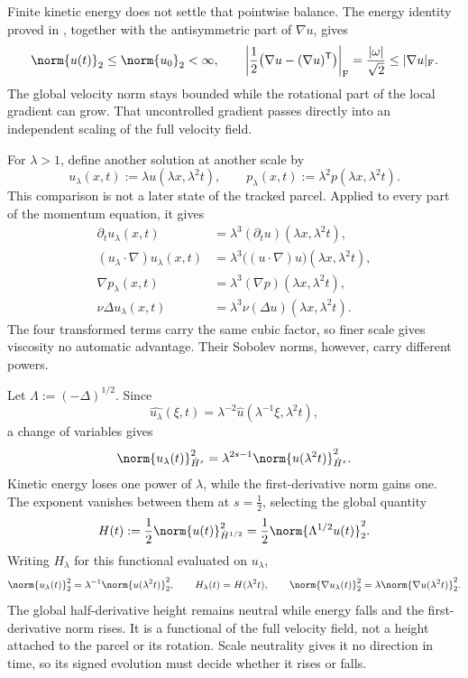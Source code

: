 Finite kinetic energy does not settle that pointwise balance. The energy identity proved in , together with the antisymmetric part of \(\nabla u\), gives
\[
  \norm{u(t)}_2
  \leq
  \norm{u_0}_2
  <\infty,
  \qquad
  \left|\frac12\bigl(\nabla u-(\nabla u)^{\mathsf T}\bigr)\right|_{\mathrm F}
  =
  \frac{|\omega|}{\sqrt2}
  \leq
  |\nabla u|_{\mathrm F}.
\]
The global velocity norm stays bounded while the rotational part of the local gradient can grow. That uncontrolled gradient passes directly into an independent scaling of the full velocity field.


For \(\lambda>1\), define another solution at another scale by
\[
  u_\lambda(x,t)
  :=
  \lambda u(\lambda x,\lambda^2t),
  \qquad
  p_\lambda(x,t)
  :=
  \lambda^2p(\lambda x,\lambda^2t).
\]
This comparison is not a later state of the tracked parcel. Applied to every part of the momentum equation, it gives
\[
\begin{aligned}
  \partial_tu_\lambda(x,t)
  &=
  \lambda^3(\partial_tu)(\lambda x,\lambda^2t),
  \\
  (u_\lambda\cdot\nabla)u_\lambda(x,t)
  &=
  \lambda^3\bigl((u\cdot\nabla)u\bigr)(\lambda x,\lambda^2t),
  \\
  \nabla p_\lambda(x,t)
  &=
  \lambda^3(\nabla p)(\lambda x,\lambda^2t),
  \\
  \nu\Delta u_\lambda(x,t)
  &=
  \lambda^3\nu(\Delta u)(\lambda x,\lambda^2t).
\end{aligned}
\]
The four transformed terms carry the same cubic factor, so finer scale gives viscosity no automatic advantage. Their Sobolev norms, however, carry different powers.


Let \(\Lambda:=(-\Delta)^{1/2}\). Since
\[
  \widehat{u_\lambda}(\xi,t)
  =
  \lambda^{-2}\widehat u(\lambda^{-1}\xi,\lambda^2t),
\]
a change of variables gives
\[
  \norm{u_\lambda(t)}_{\dot H^s}^2
  =
  \lambda^{2s-1}
  \norm{u(\lambda^2t)}_{\dot H^s}^2.
\]
Kinetic energy loses one power of \(\lambda\), while the first-derivative norm gains one. The exponent vanishes between them at \(s=\tfrac12\), selecting the global quantity
\[
  H(t)
  :=
  \frac12\norm{u(t)}_{\dot H^{1/2}}^2
  =
  \frac12\norm{\Lambda^{1/2}u(t)}_2^2.
\]
Writing \(H_\lambda\) for this functional evaluated on \(u_\lambda\),
\[
  \norm{u_\lambda(t)}_2^2
  =
  \lambda^{-1}\norm{u(\lambda^2t)}_2^2,
  \qquad
  H_\lambda(t)=H(\lambda^2t),
  \qquad
  \norm{\nabla u_\lambda(t)}_2^2
  =
  \lambda\norm{\nabla u(\lambda^2t)}_2^2.
\]
The global half-derivative height remains neutral while energy falls and the first-derivative norm rises. It is a functional of the full velocity field, not a height attached to the parcel or its rotation. Scale neutrality gives it no direction in time, so its signed evolution must decide whether it rises or falls.

